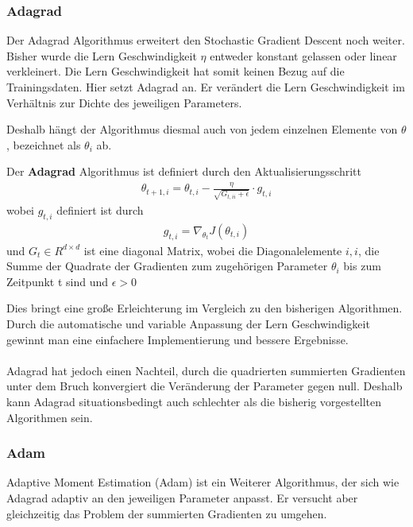 \subsubsection{Adagrad}\label{Adagrad}

Der Adagrad Algorithmus erweitert den Stochastic Gradient Descent noch weiter.
Bisher wurde die Lern Geschwindigkeit $\eta$ entweder konstant gelassen oder linear verkleinert.
Die Lern Geschwindigkeit hat somit keinen Bezug auf die Trainingsdaten. Hier setzt Adagrad an.
Er verändert die Lern Geschwindigkeit im Verhältnis zur Dichte des jeweiligen Parameters.

Deshalb hängt der Algorithmus diesmal auch von jedem einzelnen Elemente von $\theta$,
 bezeichnet als $\theta_i$ ab.
 
\begin{definition}
    \cite[Kapitel 4.3]{Ruder.9152016}
    Der \textbf{Adagrad} Algorithmus ist definiert durch den Aktualisierungsschritt
    \begin{align}
        \theta_{t+1,i} = \theta_{t,i} - \frac{\eta}{\sqrt{G_{t,ii}+\epsilon}} \cdot g_{t,i}
    \end{align}
    wobei $g_{t,i}$ definiert ist durch
    \begin{align}
        g_{t,i} = \nabla_{\theta_t} J(\theta_{t,i})
    \end{align}
    und $G_t \in R^{d\times d}$ ist eine diagonal Matrix, wobei die Diagonalelemente $i,i$, die 
    Summe der Quadrate der Gradienten zum zugehörigen Parameter $\theta_i$ bis zum Zeitpunkt
    t sind und $\epsilon > 0$ 
    
\end{definition}

Dies bringt eine große Erleichterung im Vergleich zu den bisherigen Algorithmen.
Durch die automatische und variable Anpassung der Lern Geschwindigkeit gewinnt man 
eine einfachere Implementierung und bessere Ergebnisse. 
\\\\
Adagrad hat jedoch einen Nachteil, durch die quadrierten summierten Gradienten
unter dem Bruch konvergiert die Veränderung der Parameter gegen null.
Deshalb kann Adagrad situationsbedingt auch schlechter als 
die bisherig vorgestellten Algorithmen sein. 

\subsubsection{Adam}\label{Adam}
\cite{DiederikP.KingmaandJimmyLeiBa.2015}
Adaptive Moment Estimation (Adam) ist ein Weiterer Algorithmus, 
der sich wie Adagrad adaptiv an den jeweiligen Parameter anpasst.
Er versucht aber gleichzeitig das Problem der summierten Gradienten 
zu umgehen. 

